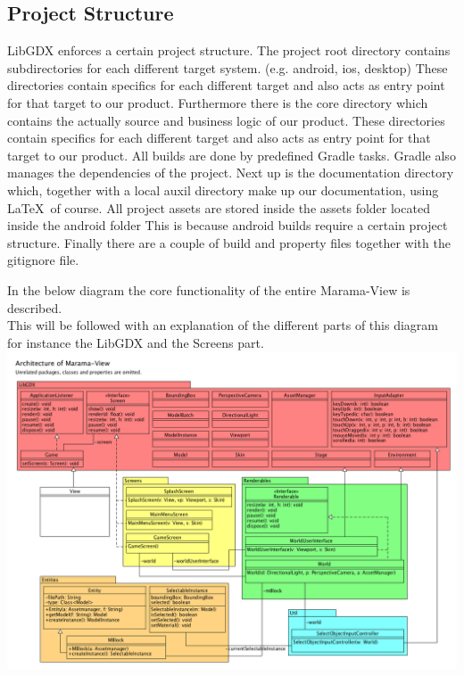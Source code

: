 \documentclass[10pt]{extarticle} %
\begin{document}
    \subsection{Project Structure}
    LibGDX enforces a certain project structure\cite{libgdxprojstruct}.
    The project root directory contains subdirectories for each different target system. (e.g. android, ios, desktop)
    These directories contain specifics for each different target and also acts as entry point for that target to our product.
    Furthermore there is the core directory which contains the actually source and business logic of our product.
    These directories contain specifics for each different target and also acts as entry point for that target to our product.
    All builds are done by predefined Gradle tasks.
    Gradle also manages the dependencies of the project.
    Next up is the documentation directory which, together with a local auxil directory make up our documentation, using \LaTeX\ of course.
    All project assets are stored inside the assets folder located inside the android folder
    This is because android builds require a certain project structure\cite{androidAssetLocation}.
    Finally there are a couple of build and property files together with the gitignore file.


    In the below diagram the core functionality of the entire Marama-View is described.\\
    This will be followed with an explanation of the different parts of this diagram for instance the LibGDX and the Screens part. \\
    \includegraphics[width=1\linewidth]{architecture-marama-view.png}
\end{document}
